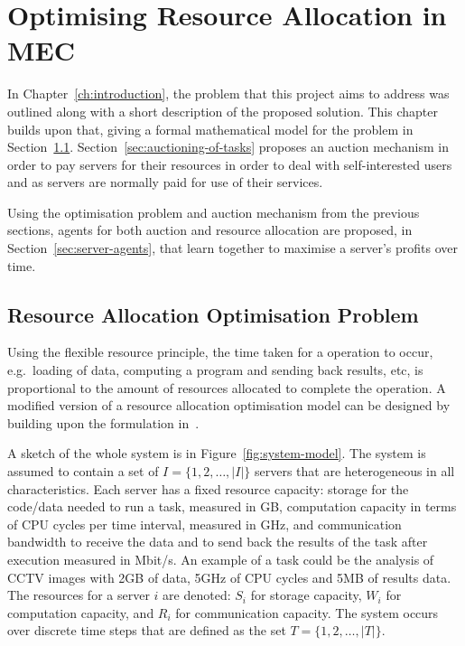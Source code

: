 

\chapter{Optimising Resource Allocation in MEC}
\label{ch:optimising-resource-allocation-in-mec}
In Chapter~\ref{ch:introduction}, the problem that this project aims to address was outlined along with a short
description of the proposed solution. This chapter builds upon that, giving a formal mathematical model for the problem
in Section~\ref{sec:resource-allocation-optimisation-problem}. Section~\ref{sec:auctioning-of-tasks} proposes an
auction mechanism in order to pay servers for their resources in order to deal with self-interested users and as servers
are normally paid for use of their services.

Using the optimisation problem and auction mechanism from the previous sections, agents for both auction and resource
allocation are proposed, in Section~\ref{sec:server-agents}, that learn together to maximise a server's profits
over time.

\section{Resource Allocation Optimisation Problem}
\label{sec:resource-allocation-optimisation-problem}
Using the flexible resource principle, the time taken for a operation to occur, e.g.\ loading of data, computing
a program and sending back results, etc, is proportional to the amount of resources allocated to complete the operation.
A modified version of a resource allocation optimisation model can be designed by building upon the formulation
in~\cite{FlexibleResourceAllocation}.

A sketch of the whole system is in Figure~\ref{fig:system-model}.
The system is assumed to contain a set of $I = \{1,2,\ldots,\left|I\right|\}$ servers that are heterogeneous in all
characteristics. Each server has a fixed resource capacity: storage for the code/data needed to run a task,
measured in GB, computation capacity in terms of CPU cycles per time interval, measured in GHz,
and communication bandwidth to receive the data and to send back the results of the task after execution
measured in Mbit/s. An example of a task could be the analysis of CCTV images with 2GB of data, 5GHz of CPU
cycles and 5MB of results data. The resources for a server $i$ are denoted: $S_i$ for storage capacity, $W_i$ for
computation capacity, and $R_i$ for communication capacity. The system occurs over discrete time steps that are defined
as the set $T = \{1,2,\ldots,\left|T\right|\}$.

